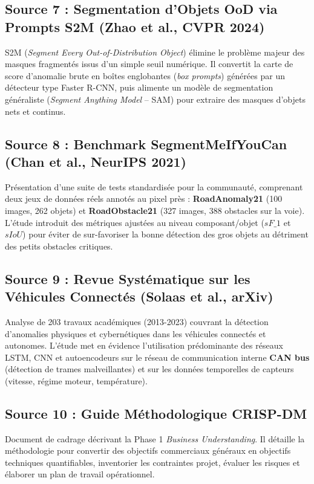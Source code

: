\documentclass[11pt,a4paper]{article} \usepackage[utf8]{inputenc} \usepackage[T1]{fontenc}
\begin{document}
\subsection{Source 7 : Segmentation d'Objets OoD via Prompts S2M (Zhao et al., CVPR 2024) \cite{s2m2024}}
S2M (\emph{Segment Every Out-of-Distribution Object}) élimine le problème majeur des masques fragmentés
issus d'un simple seuil numérique. Il convertit la carte de score d'anomalie brute en boîtes englobantes
(\emph{box prompts}) générées par un détecteur type Faster R-CNN, puis alimente un modèle de segmentation
généraliste (\emph{Segment Anything Model} -- SAM) pour extraire des masques d'objets nets et continus.
\subsection{Source 8 : Benchmark SegmentMeIfYouCan (Chan et al., NeurIPS 2021) \cite{chan2021segmentmeifyoucan}}
Présentation d'une suite de tests standardisée pour la communauté, comprenant deux jeux de données réels
annotés au pixel près : \textbf{RoadAnomaly21} (100 images, 262 objets) et \textbf{RoadObstacle21} (327
images, 388 obstacles sur la voie). L'étude introduit des métriques ajustées au niveau composant/objet
($sF\_1$ et $sIoU$) pour éviter de sur-favoriser la bonne détection des gros objets au détriment des
petits obstacles critiques.
\subsection{Source 9 : Revue Systématique sur les Véhicules Connectés (Solaas et al., arXiv) \cite{cav2023}}
Analyse de 203 travaux académiques (2013-2023) couvrant la détection d'anomalies physiques et
cybernétiques dans les véhicules connectés et autonomes. L'étude met en évidence l'utilisation
prédominante des réseaux LSTM, CNN et autoencodeurs sur le réseau de communication interne \textbf{CAN
bus} (détection de trames malveillantes) et sur les données temporelles de capteurs (vitesse, régime
moteur, température).
\subsection{Source 10 : Guide Méthodologique CRISP-DM \cite{crispdm2026}}
Document de cadrage décrivant la Phase 1 \emph{Business Understanding}. Il détaille la méthodologie pour
convertir des objectifs commerciaux généraux en objectifs techniques quantifiables, inventorier les
contraintes projet, évaluer les risques et élaborer un plan de travail opérationnel.
\end{document}
